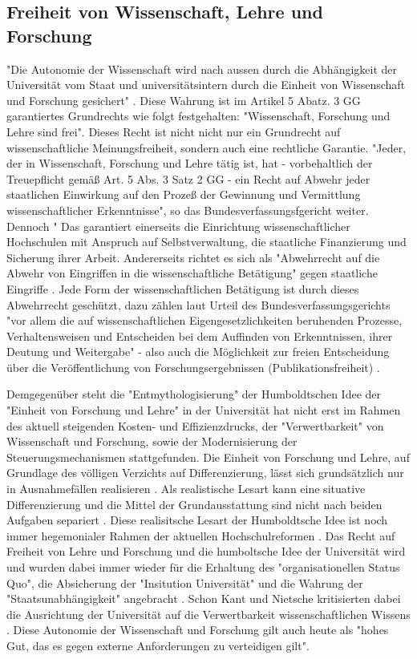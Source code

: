 \subsection{Freiheit von Wissenschaft, Lehre und Forschung}

"Die Autonomie der Wissenschaft wird nach aussen durch die Abhängigkeit der Universität vom Staat und universitätsintern durch die Einheit von Wissenschaft und Forschung gesichert" \cite{Huber_2005}. Diese Wahrung ist im Artikel 5 Abatz. 3 GG garantiertes Grundrechts wie folgt festgehalten: "Wissenschaft, Forschung und Lehre sind frei". Dieses Recht ist nicht nicht nur ein Grundrecht auf wissenschaftliche Meinungsfreiheit, sondern auch eine rechtliche Garantie. "Jeder, der in Wissenschaft, Forschung und Lehre tätig ist, hat - vorbehaltlich der Treuepflicht gemäß Art. 5 Abs. 3 Satz 2 GG - ein Recht auf Abwehr jeder staatlichen Einwirkung auf den Prozeß der Gewinnung und Vermittlung wissenschaftlicher Erkenntnisse", so das Bundesverfassungsfgericht weiter. Dennoch " Das garantiert einerseits die Einrichtung wissenschaftlicher Hochschulen mit Anspruch auf Selbstverwaltung, die staatliche Finanzierung und Sicherung ihrer Arbeit. Andererseits richtet es sich als "Abwehrrecht auf die Abwehr von Eingriffen in die wissenschaftliche Betätigung" gegen staatliche Eingriffe \cite{mayen_grundrechte_forscher} \cite{spindler_2006_rechtloa}. Jede Form der wissenschaftlichen Betätigung ist durch dieses Abwehrrecht geschützt, dazu zählen laut Urteil des Bundesverfassungsgerichts "vor allem die auf wissenschaftlichen Eigengesetzlichkeiten beruhenden Prozesse, Verhaltensweisen und Entscheiden bei dem Auffinden von Erkenntnissen, ihrer Deutung und Weitergabe" - also auch die Möglichkeit zur freien Entscheidung über die Veröffentlichung von Forschungsergebnissen (Publikationsfreiheit) \cite{Fangerau_2014}.

Demgegenüber steht die "Entmythologisierung" der Humboldtschen Idee der "Einheit von Forschung und Lehre" in der Universität hat nicht erst im Rahmen des aktuell steigenden Kosten- und Effizienzdrucks, der "Verwertbarkeit" von Wissenschaft und Forschung, sowie der Modernisierung der Steuerungsmechanismen stattgefunden. Die Einheit von Forschung und Lehre, auf Grundlage des völligen Verzichts auf Differenzierung, lässt sich grundsätzlich nur in Ausnahmefällen realisieren \cite{Schimank_2001}. Als realistische Lesart kann eine situative Differenzierung und die Mittel der Grundausstattung sind nicht nach beiden Aufgaben separiert \cite{Schimank_2001}. Diese realisitsche Lesart der Humboldtsche Idee ist noch immer hegemonialer Rahmen der aktuellen Hochschulreformen \cite{Huber_2005}. Das Recht auf Freiheit von Lehre und Forschung und die humboltsche Idee der Universität wird und wurden dabei immer wieder für die Erhaltung des "organisationellen Status Quo", die Absicherung der "Insitution Universität" und die Wahrung der "Staatsunabhängigkeit" angebracht \cite{Huber_2005}. Schon Kant und Nietsche kritisierten dabei die Ausrichtung der Universität auf die Verwertbarkeit wissenschaftlichen Wissens \cite{Huber_2005}. Diese Autonomie der Wissenschaft und Forschung gilt auch heute als "hohes Gut, das es gegen externe Anforderungen zu verteidigen gilt"\cite{kaldewey_2010}.

